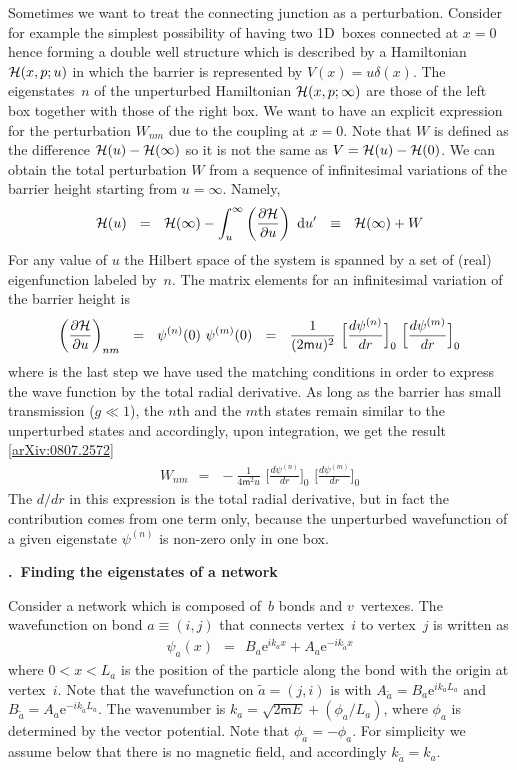 \documentclass[onecolumn,fleqn, 11pt]{revtex4}
\newcommand{\eexp}{\mathrm{e}^}
\newcommand{\mass}{\mathsf{m}}
\newcommand{\beq}{\begin{eqnarray}}
\newcommand{\eeq}{\end{eqnarray}}
\renewcommand{\thesubsection}{\arabic{subsection}}
\renewcommand{\thesubsubsection}{\arabic{subsubsection}}
\newcommand{\sheadC}[1]
{
\addtocounter{subsubsection}{1}
\vspace{5mm}
{\bf \thesubsection.\thesubsubsection \ #1}  
\nopagebreak
\phantomsection
}
\begin{document}
Sometimes we want to treat the connecting junction 
as a perturbation. Consider for example 
the simplest possibility of having two 1D~boxes 
connected at ${x=0}$ hence forming a double well structure
which is described by a Hamiltonian ${\cal H}(x,p;u)$ 
in which the barrier is represented by $V(x)=u\delta(x)$.
The eigenstates~$n$ of the unperturbed Hamiltonian ${\cal H}(x,p;\infty)$
are those of the left box together with those of the right box.     
We want to have an explicit expression for the 
perturbation $W_{nm}$ due to the coupling at ${x=0}$. 
Note that $W$ is defined as 
the difference ${{\cal H}(u)-{\cal H}(\infty)}$ 
so it is not the same as  ${V={\cal H}(u)-{\cal H}(0)}$.  
We can obtain the total perturbation $W$ 
from  a sequence of infinitesimal variations 
of the barrier height starting from ${u=\infty}$. 
Namely, 
\beq
{\cal H}(u) \ \ = \ \ 
{\cal H}(\infty)
-\int^{\infty}_{u}
\left(\frac{\partial{\cal H}}{\partial u}\right) \ \mbox{d}u' 
\ \ \equiv \ \ {\cal H}(\infty)+W
\eeq
For any value of $u$ the Hilbert space of the system 
is spanned by a set of (real) eigenfunction labeled by~$n$. 
The matrix elements for an infinitesimal variation 
of the barrier height is 
\beq
\left(\frac{\partial{\cal H}}{\partial u}\right)_{nm}
\ \ = \ \ \psi^{(n)}(0) \,\, \psi^{(m)}(0)
\ \ = \ \ 
\frac{1}{(2\mass u)^2}
\,\,
\Big[\frac{d\psi^{(n)}}{dr}\Big]_{0}
\,\,
\Big[\frac{d\psi^{(m)}}{dr}\Big]_{0}
\eeq
where is the last step we have used the matching conditions 
in order to express the wave function 
by the total radial derivative.
As long as the barrier has small transmission ($g{\ll 1}$), 
the $n$th and the $m$th states 
remain similar to the unperturbed states and accordingly, 
upon integration, we get the result [\href{http://arxiv.org/abs/0807.2572}{arXiv:0807.2572}]
\beq
W_{nm} \ \ = \ \ 
-\frac{1}{4\mass^2 u}
\,\,
\Big[\frac{d\psi^{(n)}}{dr}\Big]_{0}
\,\,
\Big[\frac{d\psi^{(m)}}{dr}\Big]_{0}
\eeq
The $d/dr$ in this expression is the total radial derivative, 
but in fact the contribution comes from one term only, 
because the unperturbed wavefunction of a given eigenstate $\psi^{(n)}$ 
is non-zero only in one box.


\sheadC{Finding the eigenstates of a network}

Consider a network which is composed of~$b$ bonds and $v$~vertexes.
The wavefunction on bond ${a\equiv(i,j)}$  
that connects vertex~$i$ to vertex~$j$ is written as
\beq
\psi_a(x) \ \ = \ \ 
B_a \eexp{ik_a x} + A_a \eexp{-ik_{\tilde{a}} x} 
\eeq
where $0<x<L_a$ is the position of the particle along the bond 
with the origin at vertex~$i$. Note that the wavefunction 
on $\tilde{a}=(j,i)$ is with ${A_{\tilde{a}}=B_a\eexp{ik_aL_a}}$
and ${B_{\tilde{a}}=A_a\eexp{-ik_{\tilde{a}}L_a}}$.
The wavenumber is $k_a = \sqrt{2\mass E} + (\phi_a/L_a)$, 
where $\phi_a$ is determined by the vector potential.  
Note that $\phi_{\tilde{a}}=-\phi_a$.
For simplicity we assume below that there is no magnetic 
field, and accordingly ${k_{\tilde{a}}=k_a}$.
\end{document}
